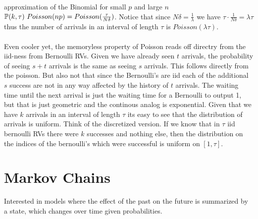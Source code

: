 \documentclass[11pt]{scrartcl}
\begin{document}
    approximation of the Binomial for small $p$ and large $n$ $\mathbb{P}(k,
    \tau)~Poisson(np)=Poisson(\frac{\tau}{N\delta})$. Notice that
    since $N\delta = \frac{1}{\lambda }$ we have $\tau \cdot \frac{1}{N\delta}
    = \lambda \tau$ thus the number of arrivals in an interval of length $\tau$
    is $Poisson(\lambda \tau)$. \\\\ Even cooler yet, the memoryless property
    of Poisson reads off directry from the iid-ness from Bernoulli RVs. Given
    we have already seen $t$ arrivals, the probability of seeing $s+t$ arrivals
    is the same as seeing $s$ arrivals. This follows directly from the poisson.
    But also not that  since the Bernoulli's are iid each of the additional $s$
    success are not in any way affected by the history of $t$ arrivals. The
    waiting time until the next arrival is just the waiting time for
    a Bernoulli to output 1, but that is just geometric and the continous
    analog is exponential. Given that we have $k$ arrivals in an interval of
    length $\tau$ its easy to see that the distribution of arrivals is uniform.
    Think of the discretized version. If we know that in $\tau$ iid bernoulli RVs
    there were $k$ successes and nothing else, then the distribution on the indices of the bernoulli's which were
    successful is uniform on $[1, \tau]$. 
\newpage
\section{Markov Chains}
Interested in models where the effect of the past on the future is summarized
by a state, which changes over time given probabilities.
\end{document}

